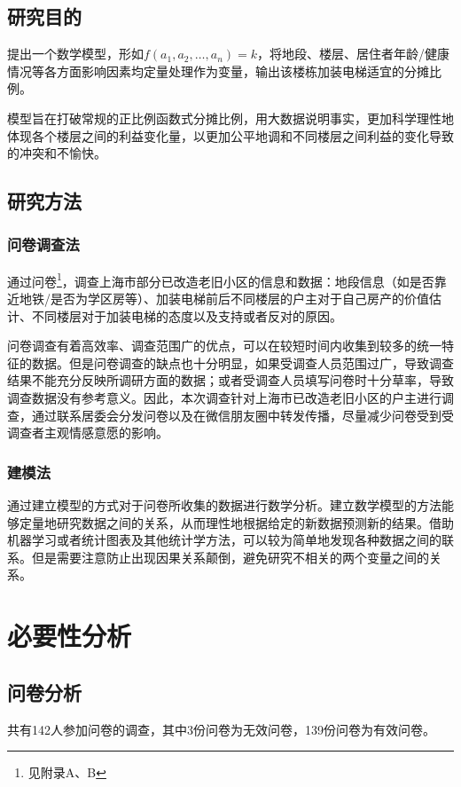 \documentclass[lang=cn,a4paper]{elegantpaper}
\begin{document}
    \subsection{研究目的}
    提出一个数学模型，形如$f(a_1,a_2,\dots,a_n)=k$，将地段、楼层、居住者年龄/健康情况等各方面影响因素均定量处理作为变量，输出该楼栋加装电梯适宜的分摊比例。

    模型旨在打破常规的正比例函数式分摊比例，用大数据说明事实，更加科学理性地体现各个楼层之间的利益变化量，以更加公平地调和不同楼层之间利益的变化导致的冲突和不愉快。
    \subsection{研究方法}

    \subsubsection{问卷调查法}
    通过问卷\footnote{见附录A、B}，调查上海市部分已改造老旧小区的信息和数据：地段信息（如是否靠近地铁/是否为学区房等）、加装电梯前后不同楼层的户主对于自己房产的价值估计、不同楼层对于加装电梯的态度以及支持或者反对的原因。

    问卷调查有着高效率、调查范围广的优点，可以在较短时间内收集到较多的统一特征的数据。但是问卷调查的缺点也十分明显，如果受调查人员范围过广，导致调查结果不能充分反映所调研方面的数据；或者受调查人员填写问卷时十分草率，导致调查数据没有参考意义。因此，本次调查针对上海市已改造老旧小区的户主进行调查，通过联系居委会分发问卷以及在微信朋友圈中转发传播，尽量减少问卷受到受调查者主观情感意愿的影响。

    \subsubsection{建模法}
    通过建立模型的方式对于问卷所收集的数据进行数学分析。建立数学模型的方法能够定量地研究数据之间的关系，从而理性地根据给定的新数据预测新的结果。借助机器学习或者统计图表及其他统计学方法，可以较为简单地发现各种数据之间的联系。但是需要注意防止出现因果关系颠倒，避免研究不相关的两个变量之间的关系。

    \section{必要性分析}
    \subsection{问卷分析}
    共有142人参加问卷的调查，其中3份问卷为无效问卷，139份问卷为有效问卷。
    
\end{document}
